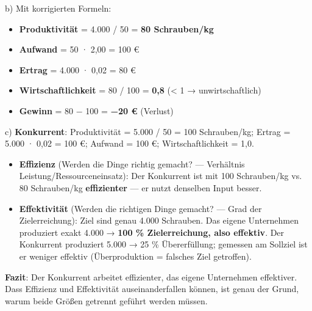 \documentclass[11pt, a4paper]{article}
\begin{document}
b) Mit korrigierten Formeln:

\begin{itemize}
  \item \textbf{Produktivität} = 4.000 / 50 = \textbf{80 Schrauben/kg}
  \item \textbf{Aufwand} = 50 · 2,00 = 100 €
  \item \textbf{Ertrag} = 4.000 · 0,02 = 80 €
  \item \textbf{Wirtschaftlichkeit} = 80 / 100 = \textbf{0,8} (< 1 → unwirtschaftlich)
  \item \textbf{Gewinn} = 80 − 100 = \textbf{−20 €} (Verlust)
\end{itemize}

c) \textbf{Konkurrent}: Produktivität = 5.000 / 50 = 100 Schrauben/kg; Ertrag = 5.000 · 0,02 = 100 €; Aufwand = 100 €; Wirtschaftlichkeit = 1,0.


\begin{itemize}
  \item \textbf{Effizienz} (Werden die Dinge richtig gemacht? — Verhältnis Leistung/Ressourceneinsatz): Der Konkurrent ist mit 100 Schrauben/kg vs. 80 Schrauben/kg \textbf{effizienter} — er nutzt denselben Input besser.
  \item \textbf{Effektivität} (Werden die richtigen Dinge gemacht? — Grad der Zielerreichung): Ziel sind genau 4.000 Schrauben. Das eigene Unternehmen produziert exakt 4.000 → \textbf{100 \% Zielerreichung, also effektiv}. Der Konkurrent produziert 5.000 → 25 \% Übererfüllung; gemessen am Sollziel ist er weniger effektiv (Überproduktion = falsches Ziel getroffen).
\end{itemize}

\textbf{Fazit}: Der Konkurrent arbeitet effizienter, das eigene Unternehmen effektiver. Dass Effizienz und Effektivität auseinanderfallen können, ist genau der Grund, warum beide Größen getrennt geführt werden müssen.





\end{document}
